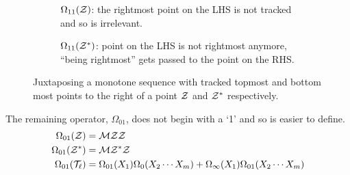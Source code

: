 \message{ !name(thesis.tex)}\documentclass[12pt, a4paper, twoside]{report}
\begin{document}
\begin{figure}[ht]
  \begin{subfigure}[t]{0.4\textwidth}
    \centering
    \caption{$\Omega_{11}(\mathcal{Z})$: the rightmost point on the LHS is not tracked and so is irrelevant.}
    \label{fig:omega_11_1}
  \end{subfigure}
  \hfill
  \begin{subfigure}[t]{0.4\textwidth}
    \centering
    \caption{$\Omega_{11}(\mathcal{Z}^*)$: point on the LHS is not rightmost anymore, ``being rightmost'' gets passed to the point on the RHS.}
    \label{fig:omega11_2}
  \end{subfigure}
  \caption{Juxtaposing a monotone sequence with tracked topmost and bottom most points to the right of a point $\mathcal{Z}$ and $\mathcal{Z}^*$ respectively.}
  \label{fig:omega11}
\end{figure}

The remaining operator, $\Omega_{01}$, does not begin with a `1' and so is easier to define.
\begin{align*}
  \Omega_{01}(\mathcal{Z}) &= \mathcal{M}\mathcal{Z}\mathcal{Z}\\
  \Omega_{01}(\mathcal{Z}^*) &= \mathcal{M}\mathcal{Z}^*\mathcal{Z}\\
  \Omega_{01}(\mathcal{T}_\ell) &= \Omega_{01}(X_1)\Omega_0(X_2\cdots X_m)+\Omega_\infty(X_1)\Omega_{01}(X_2\cdots X_m)
\end{align*}
\end{document}
